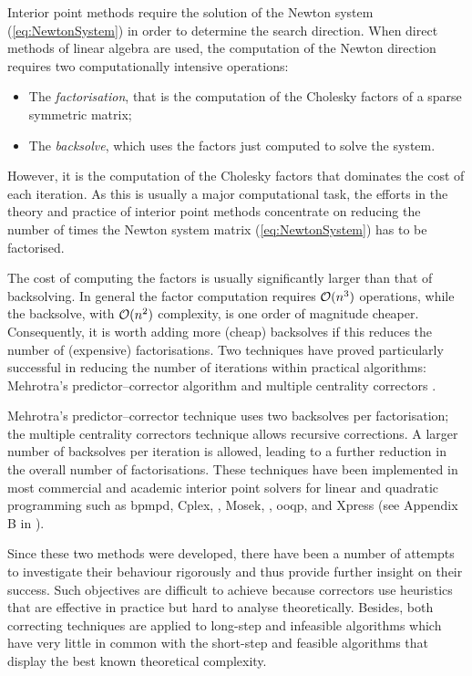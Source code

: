 Interior point methods require the solution of the Newton 
system (\ref{eq:NewtonSystem}) in order to determine
the search direction.
When direct methods of linear algebra are used, the computation 
of the Newton direction requires two computationally intensive
operations: 
\begin{itemize}
\item The {\em factorisation}, that is the computation of the 
Cholesky factors of a sparse 
symmetric matrix; 
\item The {\em backsolve}, which uses the factors just computed 
to solve the system. 
\end{itemize}
However, it is the computation of the Cholesky factors that
dominates the cost of each iteration.
As this is usually a major computational task, 
the efforts in the theory and practice of 
interior point methods concentrate on reducing 
the number of times the Newton system matrix (\ref{eq:NewtonSystem}) 
has to be factorised.


The cost of computing the factors is usually significantly 
larger than that of backsolving. In general the factor computation
requires $\mathcal{O}(n^3)$ operations, while the backsolve,
with $\mathcal{O}(n^2)$ complexity, is one order of magnitude cheaper.
Consequently, it is worth adding more (cheap) 
backsolves if this reduces the number of (expensive) factorisations. 
Two techniques have proved particularly successful in reducing 
the number of iterations within practical algorithms:
Mehrotra's predictor--corrector algorithm \cite{Mehrotra92} 
and multiple centrality correctors \cite{Gondzio96}. 

Mehrotra's predictor--corrector technique \cite{Mehrotra92} uses two 
backsolves per factorisation; the multiple centrality correctors technique
\cite{Gondzio96} allows recursive corrections. A larger number 
of backsolves per iteration is allowed, leading to a further reduction 
in the overall number of factorisations. 
These 
techniques have been implemented in most commercial and academic 
interior point solvers for linear and quadratic programming such 
as {\sc bpmpd}, Cplex, \HOPDM, Mosek, \OOPS, {\sc ooqp}, \PCx and Xpress
(see Appendix B in \cite{ipm:Wright97}).

Since these two methods were developed, there have been a number of 
attempts to investigate their behaviour rigorously and thus provide
further insight on their success. 
Such objectives are difficult to achieve because 
correctors use heuristics that are effective in practice but hard 
to analyse theoretically. 
Besides, both correcting techniques are applied to long-step and infeasible 
algorithms which have very little in common with the short-step and 
feasible algorithms that display the best known theoretical complexity.

